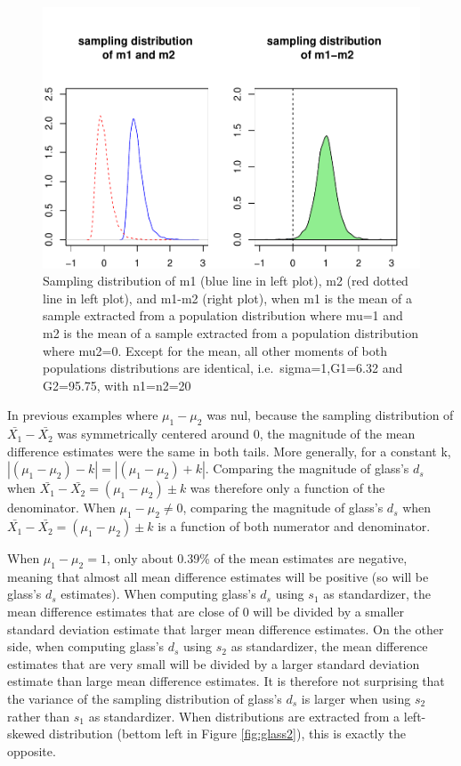 \documentclass[
  man,floatsintext]{apa6}
\begin{document}
\begin{figure}
\centering
\includegraphics{Mathematical-study-of-Glass-s-d_files/figure-latex/sampldist4-1.pdf}
\caption{\label{fig:sampldist4}Sampling distribution of m1 (blue line in left plot), m2 (red dotted line in left plot), and m1-m2 (right plot), when m1 is the mean of a sample extracted from a population distribution where mu=1 and m2 is the mean of a sample extracted from a population distribution where mu2=0. Except for the mean, all other moments of both populations distributions are identical, i.e.~sigma=1,G1=6.32 and G2=95.75, with n1=n2=20}
\end{figure}

In previous examples where \(\mu_1-\mu_2\) was nul, because the sampling distribution of \(\bar{X_1}-\bar{X_2}\) was symmetrically centered around 0, the magnitude of the mean difference estimates were the same in both tails. More generally, for a constant k, \(|(\mu_1-\mu_2)-k|=|(\mu_1-\mu_2)+k|\). Comparing the magnitude of glass's \(d_s\) when \(\bar{X_1}-\bar{X_2} = (\mu_1-\mu_2) \pm k\) was therefore only a function of the denominator. When \(\mu_1-\mu_2 \neq 0\), comparing the magnitude of glass's \(d_s\) when \(\bar{X_1}-\bar{X_2} = (\mu_1-\mu_2) \pm k\) is a function of both numerator and denominator.

When \(\mu_1-\mu_2=1\), only about 0.39\% of the mean estimates are negative, meaning that almost all mean difference estimates will be positive (so will be glass's \(d_s\) estimates). When computing glass's \(d_s\) using \(s_1\) as standardizer, the mean difference estimates that are close of 0 will be divided by a smaller standard deviation estimate that larger mean difference estimates. On the other side, when computing glass's \(d_s\) using \(s_2\) as standardizer, the mean difference estimates that are very small will be divided by a larger standard deviation estimate than large mean difference estimates. It is therefore not surprising that the variance of the sampling distribution of glass's \(d_s\) is larger when using \(s_2\) rather than \(s_1\) as standardizer. When distributions are extracted from a left-skewed distribution (bettom left in Figure \ref{fig:glass2}), this is exactly the opposite.
\end{document}
